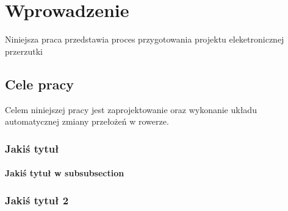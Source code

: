 \chapter{Wprowadzenie}
\label{cha:wprowadzenie}

Niniejsza praca przedstawia proces przygotowania projektu eleketronicznej przerzutki

\section{Cele pracy}
\label{sec:celePracy}

Celem niniejszej pracy jest zaprojektowanie oraz wykonanie układu automatycznej zmiany przełożeń w rowerze.

\subsection{Jakiś tytuł}

\subsubsection{Jakiś tytuł w subsubsection}


\subsection{Jakiś tytuł 2}